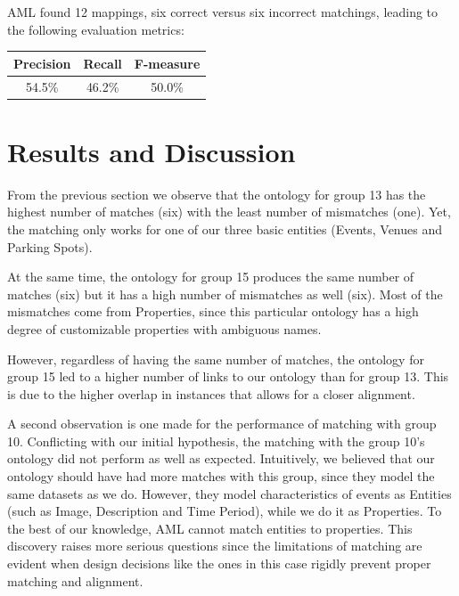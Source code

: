\documentclass[runningheads,a4paper]{../../StyleFiles/llncs}
\begin{document}
AML found 12 mappings, six correct versus six incorrect matchings, leading to the following evaluation metrics: 

\begin{center}
	\begin{tabular}{| c | c | c |}
		\hline
		\textbf{Precision} & \textbf{Recall} & \textbf{F-measure} \\ \hline
		54.5\% & 46.2\% & 50.0\% \\ \hline
	\end{tabular}
\end{center}


\section{Results and Discussion}
From the previous section we observe that the ontology for group 13 has the highest number of matches (six) with the least number of mismatches (one). Yet, the matching only works for one of our three basic entities (Events, Venues and Parking Spots). 

At the same time, the ontology for group 15 produces the same number of matches (six) but it has a high number of mismatches as well (six). Most of the mismatches come from Properties, since this particular ontology has a high degree of customizable properties with ambiguous names. 

However, regardless of having the same number of matches, the ontology for group 15 led to a higher number of links to our ontology than for group 13. This is due to the higher overlap in instances that allows for a closer alignment.

A second observation is one made for the performance of matching with group 10. Conflicting with our initial hypothesis, the matching with the group 10's ontology did not perform as well as expected. Intuitively, we believed that our ontology should have had more matches with this group, since they model the same datasets as we do. However, they model characteristics of events as Entities (such as Image, Description and Time Period), while we do it as Properties. To the best of our knowledge, AML cannot match entities to properties. This discovery raises more serious questions since the limitations of matching are evident when design decisions like the ones in this case rigidly prevent proper matching and alignment.
\end{document}
